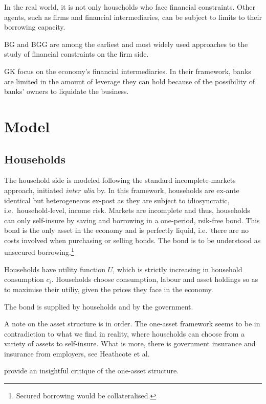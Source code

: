 \documentclass[12pt]{article}
\numberwithin{equation}{section} %
\begin{document}
In the real world, it is not only households who face financial constraints. Other agents, such as firms and financial intermediaries, can be subject to limits to their borrowing capacity.

BG and BGG are among the earliest and most widely used approaches to the study of financial constraints on the firm side.

GK focus on the economy's financial intermediaries. In their framework, banks are limited in the amount of leverage they can hold because of the possibility of banks' owners to liquidate the business.

\section{Model}
\label{sec:model}

\subsection{Households}
\label{sec:model-hh}

The household side is modeled following the standard incomplete-markets approach, initiated \textit{inter alia} by. In this framework, households are ex-ante identical but heterogeneous ex-post as they are subject to idiosyncratic, i.e.~household-level, income risk. Markets are incomplete and thus, households can only self-insure by saving and borrowing in a one-period, rsik-free bond. This bond is the only asset in the economy and is perfectly liquid, i.e.~there are no costs involved when purchasing or selling bonds. The bond is to be understood as unsecured borrowing.\footnote{Secured borrowing would be collateralised.}

Households have utility function $U$, which is strictly increasing in household consumption $c_i$. Households choose consumption, labour and asset holdings so as to maximise their utiliy, given the prices they face in the economy.

The bond is supplied by households and by the government. %

A note on the asset structure is in order. The one-asset framework seems to be in contradiction to what we find in reality, where households can choose from a variety of assets to self-insure. What is more, there is government insurance and insurance from employers, see Heathcote et al.

\textcite{kaplan2018} provide an insightful critique of the one-asset structure. 
\end{document}
